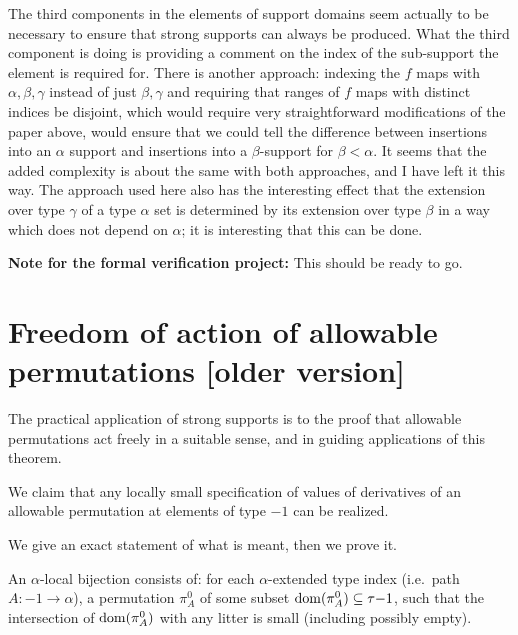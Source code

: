 The third components in the elements of support domains seem actually to be necessary to ensure that strong supports can always be produced.  What the third component is doing is providing a comment on the index of the sub-support the element is required for.  There is another approach:  indexing the $f$ maps with $\alpha,\beta,\gamma$ instead of just $\beta,\gamma$ and requiring that ranges of $f$ maps with distinct indices be disjoint, which would require very straightforward modifications of the paper above, would ensure that we could tell the difference between insertions into an $\alpha$ support and insertions into a $\beta$-support for $\beta<\alpha$.  It seems that the added complexity is about the same with both approaches, and I have left it this way.  The approach used here also has the interesting effect that the extension over type $\gamma$ of a type $\alpha$ set is determined by its extension over type $\beta$ in a way which does not depend on $\alpha$;  it is interesting that this can be done.


{\bf Note for the formal verification project:}  This should be ready to go.

\section{Freedom of action of allowable permutations [older version]}

The practical application of strong supports is to the proof that allowable permutations act freely in a suitable sense, and in guiding applications of this theorem.

We claim that any locally small specification of values of derivatives of an allowable permutation at elements of type $-1$ can be realized.

We give an exact statement of what is meant, then we prove it.

\begin{definition}
\label {def:local-bijection}
\leanok
{}
An $\alpha$-local bijection consists of: for each $\alpha$-extended type index (i.e.\ path $A : -1 \to \alpha$), a permutation $\pi^0_A$ of some subset $\mathrm{dom}(\pi^0_A) \subseteq \tau{-1}$, such that the intersection of $\mathrm{dom}(\pi^0_A)$ with any litter is small (including possibly empty).
\end{definition}

